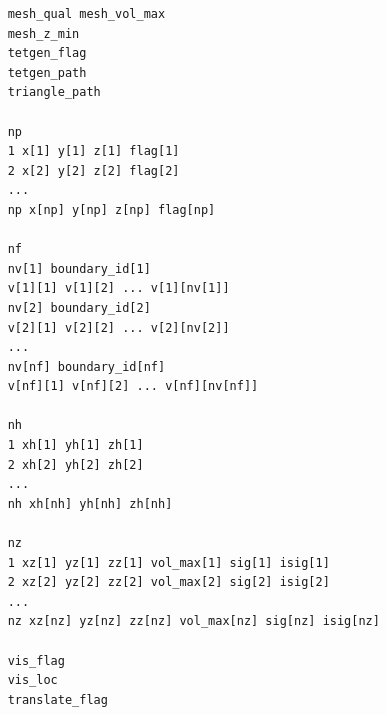 \documentclass[a4paper,12pt]{article}
\begin{document}
\begin{framed}
\begingroup
\small
\begin{verbatim}
    mesh_qual mesh_vol_max
    mesh_z_min
    tetgen_flag
    tetgen_path
    triangle_path
    
    np
    1 x[1] y[1] z[1] flag[1]
    2 x[2] y[2] z[2] flag[2]
    ...
    np x[np] y[np] z[np] flag[np]
    
    nf
    nv[1] boundary_id[1]
    v[1][1] v[1][2] ... v[1][nv[1]]
    nv[2] boundary_id[2]
    v[2][1] v[2][2] ... v[2][nv[2]]
    ...
    nv[nf] boundary_id[nf]
    v[nf][1] v[nf][2] ... v[nf][nv[nf]]
    
    nh
    1 xh[1] yh[1] zh[1]
    2 xh[2] yh[2] zh[2]
    ...
    nh xh[nh] yh[nh] zh[nh]
    
    nz
    1 xz[1] yz[1] zz[1] vol_max[1] sig[1] isig[1]
    2 xz[2] yz[2] zz[2] vol_max[2] sig[2] isig[2]
    ...
    nz xz[nz] yz[nz] zz[nz] vol_max[nz] sig[nz] isig[nz]
    
    vis_flag
    vis_loc
    translate_flag
\end{verbatim}
\endgroup
\end{framed}
\end{document}
